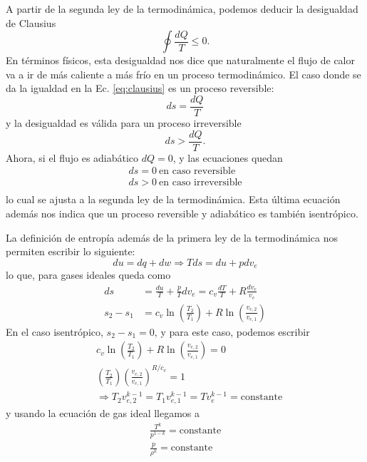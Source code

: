 A partir de la segunda ley de la termodinámica, podemos deducir la desigualdad de Clausius
%
\begin{equation}\label{eq:clausius}
\oint \frac{dQ}{T}\leq0.
\end{equation}
% 
En términos físicos, esta desigualdad nos dice que naturalmente el flujo de calor va a ir de más caliente a más frío en un proceso termodinámico.
El caso donde se da la igualdad en la Ec. \eqref{eq:clausius} es un proceso reversible:
%
\begin{equation}
ds = \frac{dQ}{T}
\end{equation}
%
y la desigualdad es válida para un proceso irreversible
%
\begin{equation}
ds>\frac{dQ}{T}.
\end{equation}
%
Ahora, si el flujo es adiabático $dQ=0$, y las ecuaciones quedan
%
\begin{align}
ds = 0 \ \text{en caso reversible}\nonumber\\
ds > 0 \ \text{en caso irreversible}\nonumber\\
\end{align}
%
lo cual se ajusta a la segunda ley de la termodinámica.
Esta última ecuación además nos indica que un proceso reversible y adiabático es también isentrópico.

La definición de entropía además de la primera ley de la termodinámica nos permiten escribir lo siguiente:
%
\begin{equation}
du = dq + dw \Rightarrow Tds = du+pdv_e
\end{equation}
%
lo que, para gases ideales queda como
%
\begin{align}
ds &= \frac{du}{T}+\frac{p}{T}dv_e = c_v\frac{dT}{T}+R\frac{dv_e}{v_e}\nonumber\\
s_2-s_1 &= c_v\ln\left(\frac{T_2}{T_1}\right) + R\ln\left(\frac{v_{e,2}}{v_{e,1}}\right) 
\end{align}
%
En el caso isentrópico, $s_2-s_1=0$, y para este caso, podemos escribir
%
\begin{align}
&c_v\ln\left(\frac{T_2}{T_1}\right) + R\ln\left(\frac{v_{e,2}}{v_{e,1}}\right)=0 \nonumber\\
&\left(\frac{T_2}{T_1}\right)\left(\frac{v_{e,2}}{v_{e,1}}\right)^{R/c_v}=1\nonumber\\
&\Rightarrow T_2v_{e,2}^{k-1}=T_1v_{e,1}^{k-1}=Tv_{e}^{k-1}=\text{constante}
\end{align}
%
y usando la ecuación de gas ideal llegamos a
%
\begin{align}\label{eq:isentropico}
\frac{T^k}{p^{1-k}}=\text{constante}\nonumber\\
\frac{p}{\rho^k}=\text{constante}
\end{align}

